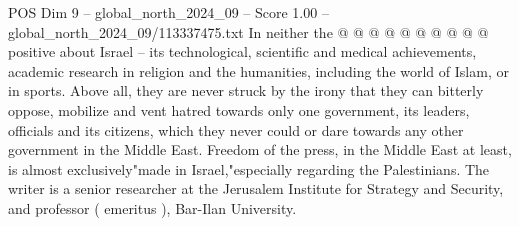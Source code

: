 \begin{textsample}{POS Dim 9 – global\_north\_2024\_09 – Score 1.00 – global\_north\_2024\_09/113337475.txt}
In neither the @ @ @ @ @ @ @ @ @ @ positive about Israel -- its technological, scientific and medical achievements, academic research in religion and the humanities, including the world of Islam, or in sports.
Above all, they are never struck by the irony that they can bitterly oppose, mobilize and vent hatred towards only one government, its leaders, officials and its citizens, which they never could or dare towards any other government in the Middle East.
Freedom of the press, in the Middle East at least, is almost exclusively"made in Israel,"especially regarding the Palestinians.
The writer is a senior researcher at the Jerusalem Institute for Strategy and Security, and professor ( emeritus ), Bar-Ilan University.

\end{textsample}
